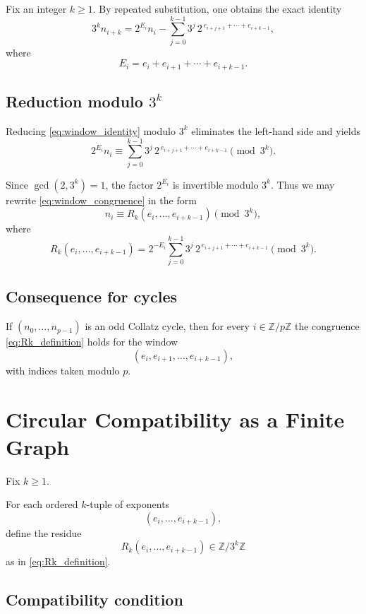 \documentclass[11pt]{article}
\theoremstyle{definition}
\theoremstyle{plain}
\theoremstyle{remark}
\begin{document}
Fix an integer $k\ge 1$.
By repeated substitution, one obtains the exact identity
\begin{equation}\label{eq:window_identity}
3^k n_{i+k}
=
2^{E_i} n_i
-
\sum_{j=0}^{k-1}
3^{j} \,
2^{\,e_{i+j+1}+\cdots+e_{i+k-1}},
\end{equation}
where
\[
E_i = e_i+e_{i+1}+\cdots+e_{i+k-1}.
\]

\subsection{Reduction modulo $3^k$}

Reducing \eqref{eq:window_identity} modulo $3^k$ eliminates the left-hand side and yields
\begin{equation}\label{eq:window_congruence}
2^{E_i} n_i
\equiv
\sum_{j=0}^{k-1}
3^{j} \,
2^{\,e_{i+j+1}+\cdots+e_{i+k-1}}
\pmod{3^k}.
\end{equation}

Since $\gcd(2,3^k)=1$, the factor $2^{E_i}$ is invertible modulo $3^k$.
Thus we may rewrite \eqref{eq:window_congruence} in the form
\begin{equation}\label{eq:Rk_definition}
n_i \equiv R_k(e_i,\dots,e_{i+k-1})
\pmod{3^k},
\end{equation}
where
\[
R_k(e_i,\dots,e_{i+k-1})
=
2^{-E_i}
\sum_{j=0}^{k-1}
3^{j} \,
2^{\,e_{i+j+1}+\cdots+e_{i+k-1}}
\pmod{3^k}.
\]

\subsection{Consequence for cycles}

If $(n_0,\dots,n_{p-1})$ is an odd Collatz cycle, then for every
$i\in\mathbb{Z}/p\mathbb{Z}$ the congruence \eqref{eq:Rk_definition}
holds for the window
\[
(e_i,e_{i+1},\dots,e_{i+k-1}),
\]
with indices taken modulo $p$.

\section{Circular Compatibility as a Finite Graph}\label{sec:circ-compat}

Fix $k \ge 1$.

For each ordered $k$-tuple of exponents
\[
(e_i,\dots,e_{i+k-1}),
\]
define the residue
\[
R_k(e_i,\dots,e_{i+k-1})
\in \mathbb{Z}/3^k\mathbb{Z}
\]
as in \eqref{eq:Rk_definition}.

\subsection{Compatibility condition}
\end{document}
